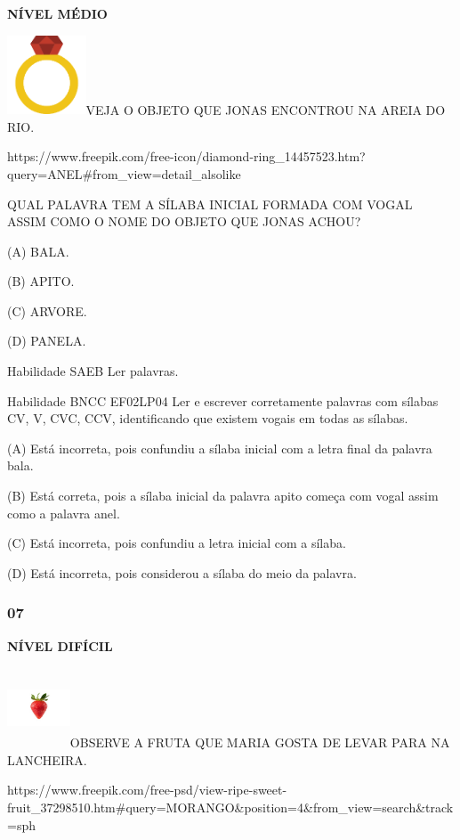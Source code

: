 \textbf{NÍVEL MÉDIO}

\includegraphics[width=0.92222in,height=0.92222in]{media/image151.png}VEJA
O OBJETO QUE JONAS ENCONTROU NA AREIA DO RIO.

https://www.freepik.com/free-icon/diamond-ring\_14457523.htm?query=ANEL\#from\_view=detail\_alsolike

QUAL PALAVRA TEM A SÍLABA INICIAL FORMADA COM VOGAL ASSIM COMO O NOME DO
OBJETO QUE JONAS ACHOU?

(A) BALA.

(B) APITO.

(C) ARVORE.

(D) PANELA.

Habilidade SAEB Ler palavras.

Habilidade BNCC EF02LP04 Ler e escrever corretamente palavras com
sílabas CV, V, CVC, CCV, identificando que existem vogais em todas as
sílabas.

(A) Está incorreta, pois confundiu a sílaba inicial com a letra final da
palavra bala.

(B) Está correta, pois a sílaba inicial da palavra apito começa com
vogal assim como a palavra anel.

(C) Está incorreta, pois confundiu a letra inicial com a sílaba.

(D) Está incorreta, pois considerou a sílaba do meio da palavra.

\subsubsection{07}\label{section-117}

\textbf{NÍVEL DIFÍCIL}

\includegraphics[width=0.73819in,height=0.93750in]{media/image152.jpeg}OBSERVE
A FRUTA QUE MARIA GOSTA DE LEVAR PARA NA LANCHEIRA.

https://www.freepik.com/free-psd/view-ripe-sweet-fruit\_37298510.htm\#query=MORANGO\&position=4\&from\_view=search\&track=sph

